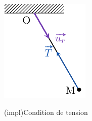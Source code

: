 \documentclass[../../main/main.tex]{subfiles}
\begin{document}
\begin{tcb*}[sidebyside, righthand ratio=.18]
\begin{center}
{			\includegraphics[width=\linewidth]{tension_prof}
		}%
		\vspace{-15pt}
	\end{center}
\end{tcb*}

\begin{tcb*}[bld](impl){Condition de tension}
	\begin{center}
	\end{center}
\end{tcb*}
\end{document}
